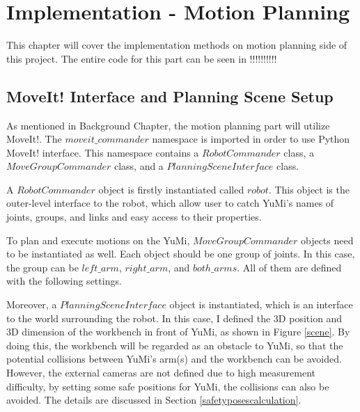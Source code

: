 \chapter{Implementation - Motion Planning}

This chapter will cover the implementation methods on motion planning side of this project. The entire code for this part can be seen in !!!!!!!!!!

\section{MoveIt! Interface and Planning Scene Setup}
As mentioned in Background Chapter, the motion planning part will utilize MoveIt!. The $moveit\_commander$ namespace is imported in order to use Python MoveIt! interface. This namespace contains a $RobotCommander$ class, a $MoveGroupCommander$ class, and a $PlanningSceneInterface$ class.

A $RobotCommander$ object is firstly instantiated called $robot$. This object is the outer-level interface to the robot, which allow user to catch YuMi's names of joints, groups, and links and easy access to their properties.

To plan and execute motions on the YuMi, $MoveGroupCommander$ objects need to be instantiated as well. Each object should be one group of joints. In this case, the group can be $left\_arm$, $right\_arm$, and $both\_arms$. All of them are defined with the following settings.

\begin{table}[H]
\centering
{}
\caption{Settings of three $MoveGroupCommander$ objects}
\label{armsetup}
\end{table}

Moreover, a $PlanningSceneInterface$ object is instantiated, which is an interface to the world surrounding the robot. In this case, I defined the 3D position and 3D dimension of the workbench in front of YuMi, as shown in Figure \ref{scene}. By doing this, the workbench will be regarded as an obstacle to YuMi, so that the potential collisions between YuMi's arm(s) and the workbench can be avoided. However, the external cameras are not defined due to high measurement difficulty, by setting some safe positions for YuMi, the collisions can also be avoided. The details are discussed in Section \ref{safetyposescalculation}.


